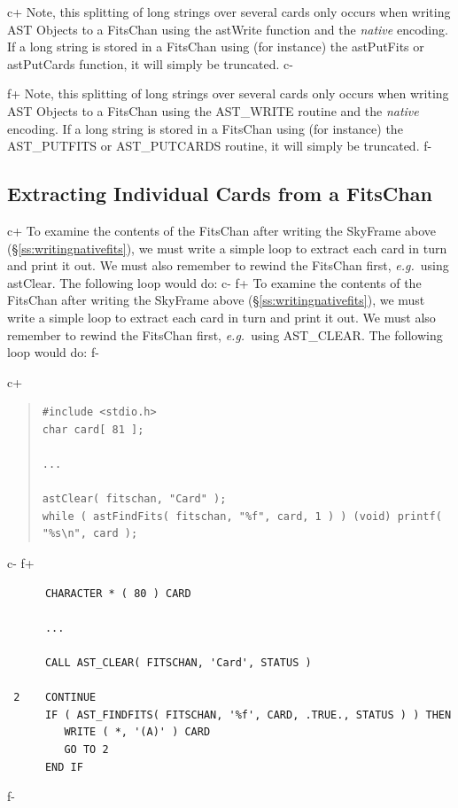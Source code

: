 \documentclass[twoside,11pt]{article}
\newcommand{\secref}[1]{\S\ref{#1}}
\newcommand{\secref}[1]{\ref{#1}}
\begin{document}
c+
Note, this splitting of long strings over several cards only occurs when
writing AST Objects to a FitsChan using the astWrite function and the
{\em native} encoding. If a long string is stored in a FitsChan using
(for instance) the astPutFits or astPutCards function, it will simply be truncated.
c- 

f+
Note, this splitting of long strings over several cards only occurs when
writing AST Objects to a FitsChan using the AST\_WRITE routine and the
{\em native} encoding. If a long string is stored in a FitsChan using
(for instance) the AST\_PUTFITS or AST\_PUTCARDS routine, it will simply be truncated.
f- 

\subsection{\label{ss:extractingfitscards}Extracting Individual Cards from a FitsChan}

c+
To examine the contents of the FitsChan after writing the SkyFrame
above (\secref{ss:writingnativefits}), we must write a simple loop to
extract each card in turn and print it out. We must also remember to
rewind the FitsChan first, {\em{e.g.}}\ using astClear. The following
loop would do:
c-
f+
To examine the contents of the FitsChan after writing the SkyFrame
above (\secref{ss:writingnativefits}), we must write a simple loop to
extract each card in turn and print it out. We must also remember to
rewind the FitsChan first, {\em{e.g.}}\ using AST\_CLEAR. The
following loop would do:
f-

c+
\begin{quote}
\small
\begin{verbatim}
#include <stdio.h>
char card[ 81 ];

...

astClear( fitschan, "Card" );
while ( astFindFits( fitschan, "%f", card, 1 ) ) (void) printf( "%s\n", card );
\end{verbatim}
\normalsize
\end{quote}
c-
f+
\small
\begin{verbatim}
      CHARACTER * ( 80 ) CARD

      ...

      CALL AST_CLEAR( FITSCHAN, 'Card', STATUS )

 2    CONTINUE
      IF ( AST_FINDFITS( FITSCHAN, '%f', CARD, .TRUE., STATUS ) ) THEN
         WRITE ( *, '(A)' ) CARD
         GO TO 2
      END IF
\end{verbatim}
\normalsize
f-
\end{document}
